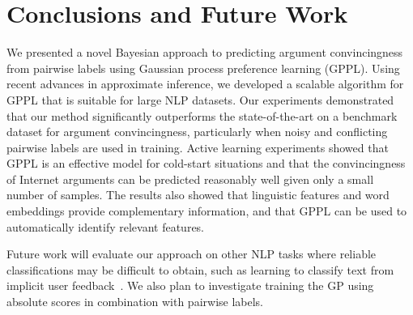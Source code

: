 \section{Conclusions and Future Work}

We presented a novel Bayesian approach to predicting argument convincingness from pairwise labels using
Gaussian process preference learning (GPPL).
Using recent advances in approximate inference, we developed a scalable algorithm for GPPL 
that is suitable for large NLP datasets.
Our experiments demonstrated that our method significantly outperforms the state-of-the-art
on a benchmark dataset for argument convincingness, 
particularly when noisy and conflicting pairwise labels are used in training.
Active learning experiments showed that GPPL is an effective model for cold-start situations 
and that the convincingness of Internet arguments can be predicted reasonably 
well given only a small number of samples.
The results also showed that linguistic features and word embeddings provide complementary information,
and that GPPL can be used to automatically identify relevant features.

Future work will evaluate our approach on other NLP tasks 
where reliable classifications may be difficult to obtain, 
such as learning to classify text from implicit user feedback~\cite{joachims2002optimizing}.
We also plan to investigate training the GP using absolute scores in combination with pairwise labels.
